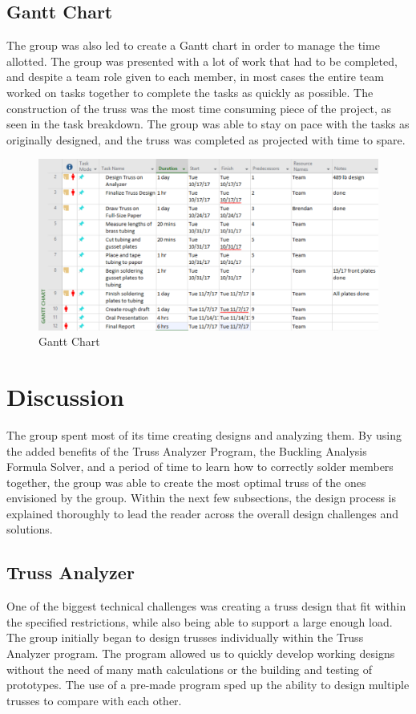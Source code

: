 \documentclass{article}
\begin{document}
\subsection{Gantt Chart}
The group was also led to create a Gantt chart in order to manage the time allotted. The group was presented with a lot of work that had to be completed, and despite a team role given to each member, in most cases the entire team worked on tasks together to complete the tasks as quickly as possible. The construction of the truss was the most time consuming piece of the project, as seen in the task breakdown. The group was able to stay on pace with the tasks as originally designed, and the truss was completed as projected with time to spare.

\begin{figure}[ht]
\caption{Gantt Chart}
\centering
\includegraphics[width=400pt]{GanttChart.png}
\end{figure}

\newpage

\section{Discussion}
The group spent most of its time creating designs and analyzing them. By using the added benefits of the Truss Analyzer Program, the Buckling Analysis Formula Solver, and a period of time to learn how to correctly solder members together, the group was able to create the most optimal truss of the ones envisioned by the group. Within the next few subsections, the design process is explained thoroughly to lead the reader across the overall design challenges and solutions. 


\subsection{Truss Analyzer}
 One of the biggest technical challenges was creating a truss design that fit within the specified restrictions, while also being able to support a large enough load. The group initially began to design trusses individually within the Truss Analyzer program. The program allowed us to quickly develop working designs without the need of many math calculations or the building and testing of prototypes. The use of a pre-made program sped up the ability to design multiple trusses to compare with each other. 
 
\end{document}
